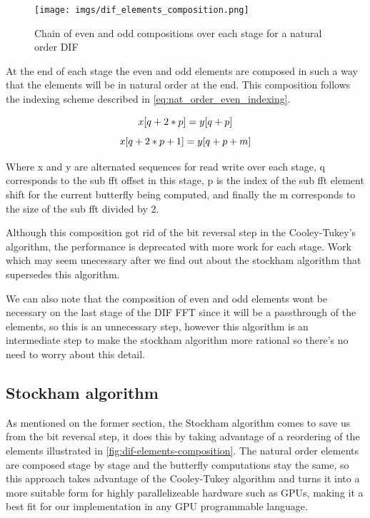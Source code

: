 \documentclass[
  oneside,
  11pt, a4paper,
  footinclude=true,
  headinclude=true,
  cleardoublepage=empty
]{scrbook}
\begin{document}
\begin{figure}[h] 
    \centering
    \texttt{[image: imgs/dif\_elements\_composition.png]}
    \caption{Chain of even and odd compositions over each stage for a natural order DIF}
    \label{fig:dif-elements-composition}
\end{figure}

At the end of each stage the even and odd elements are composed in such a way that the elements will be in natural order at the end. This composition follows the indexing scheme described in \autoref{eq:nat_order_even_indexing}.

\begin{equation} \label{eq:nat_order_even_indexing}
    x[q + 2*p] = y[q + p] \\
\end{equation}
\begin{equation} \label{eq:nat_order_odd_indexing}
    x[q + 2*p + 1] = y[q + p + m] \\
\end{equation}

Where x and y are alternated sequences for read write over each stage, q corresponds to the sub fft offset in this stage, p is the index of the sub fft element shift for the current butterfly being computed, and finally the m corresponds to the size of the sub fft divided by 2.

Although this composition got rid of the bit reversal step in the Cooley-Tukey's algorithm, the performance is deprecated with more work for each stage. Work which may seem unecessary after we find out about the stockham algorithm that supersedes this algorithm.

We can also note that the composition of even and odd elements wont be necessary on the last stage of the DIF FFT since it will be a passthrough of the elements, so this is an unnecessary step, however this algorithm is an intermediate step to make the stockham algorithm more rational so there's no need to worry about this detail.



\subsection{Stockham algorithm} \label{subsec:stockham-algorithm}

As mentioned on the former section, the Stockham algorithm comes to save us from the bit reversal step, it does this by taking advantage of a reordering of the elements \cite{govindaraju2008high} illustrated in \autoref{fig:dif-elements-composition}. The natural order elements are composed stage by stage and the butterfly computations stay the same, so this approach takes advantage of the Cooley-Tukey algorithm and turns it into a more suitable form for highly parallelizeable hardware such as GPUs, making it a best fit for our implementation in any GPU programmable language. \newline
\end{document}
